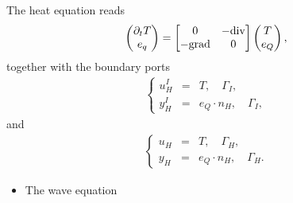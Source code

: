 \documentclass[letterpaper,10pt,english]{sphinxmanual}
\begin{document}
\sphinxAtStartPar
The heat equation reads
\begin{equation*}
\begin{split}\begin{pmatrix} \partial_t T \\ e_q \end{pmatrix} =
\begin{bmatrix} 0 & - {\rm div} \\ - {\rm grad} & 0 \end{bmatrix}
\begin{pmatrix} T \\ e_Q \end{pmatrix},\end{split}
\end{equation*}
\sphinxAtStartPar
together with the boundary ports
\begin{equation*}
\begin{split}\left\lbrace
\begin{array}{rcl}
u^I_H &=& T, \quad \Gamma_I, \\
y^I_H &=& e_Q \cdot n_H, \quad \Gamma_I,
\end{array}
\right.\end{split}
\end{equation*}
\sphinxAtStartPar
and
\begin{equation*}
\begin{split}\left\lbrace
\begin{array}{rcl}
u_H &=& T, \quad \Gamma_H, \\
y_H &=& e_Q \cdot n_H, \quad \Gamma_H.
\end{array}
\right.\end{split}
\end{equation*}\begin{itemize}
\item {} 
\sphinxAtStartPar
The wave equation

\end{itemize}
\end{document}
